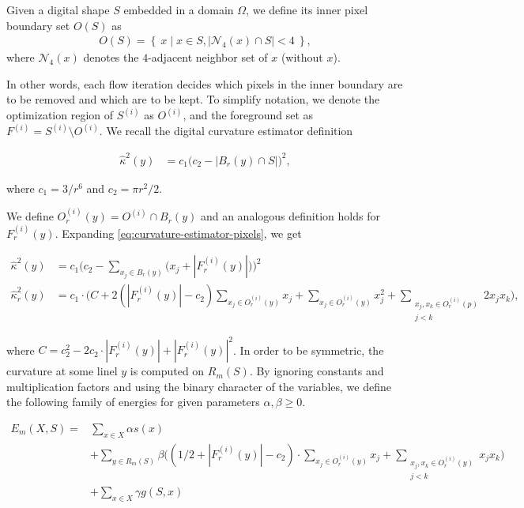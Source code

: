 \documentclass[runningheads]{llncs}
\begin{document}
\begin{definition}
{
Given a digital shape $S$ embedded in a domain $\Omega$, we define its inner pixel boundary set $O(S)$ as
\begin{align*}
	O(S) = \left\{ \: x \; | \; x \in S, |\mathcal{N}_4(x) \cap S|<4 \: \right\},
\end{align*}
where $\mathcal{N}_4(x)$ denotes the $4$-adjacent neighbor set of $x$ (without $x$).
}
\end{definition}

In other words, each flow iteration decides which pixels in the inner boundary are to be removed and which are to be kept. To simplify notation, we denote the optimization region of $S^{(i)}$ as $O^{(i)}$, and the foreground set as $F^{(i)} = S^{(i)} \setminus O^{(i)}$. We recall the digital curvature estimator definition
	
\begin{align}
	\hat{\kappa}^2(y) &= c_1\Big( c_2 - | B_r(y) \cap S | \Big)^2, 
	\label{eq:curvature-estimator-pixels}
\end{align}

where $c_1=3/r^6$ and $c_2=\pi r^2/2$. 

We define $O_{r}^{(i)}(y) = O^{(i)} \cap B_r(y)$ and an analogous definition holds for $F_{r}^{(i)}(y)$. Expanding \eqref{eq:curvature-estimator-pixels}, we get 

	\begin{align*}
		\hat{\kappa}^2(y) &= c_1\Big( c_2 - \sum_{x_j \in B_r(y)} \big( {x_j} + |F_{r}^{(i)}(y)| \big) \Big)^2 \\
		\hat{\kappa}_{r}^2(y) &= c_1 \cdot \Big( C + 2\left( |F_{r}^{(i)}(y)| - c_2 \right) \sum_{x_j \in O_{r}^{(i)}(y)}{x_j} + \sum_{x_j \in O_{r}^{(i)}(y)}{x_j^2} + \sum_{ \substack{x_j,x_k \in O_{r}^{(i)}(p) \\ j<k} }{2x_jx_k}  \Big),
	\end{align*}
	
	where $C=c_2^2 - 2c_2 \cdot |F_{r}^{(i)}(y)| + |F_{r}^{(i)}(y)|^2$. In order to be symmetric, the curvature at some linel $y$ is computed on $R_m(S)$. By ignoring constants and multiplication factors and using the binary character of the variables, we define the following family of energies for given parameters $\alpha,\beta \geq 0$.
	
	\begin{align}
		E_m(X,S) =& \sum_{x \in X}{\alpha s(x)} \nonumber \\ 
		& + \sum_{y \in R_m(S)}{ \beta \Big( { (1/2+ |F_{r}^{(i)}(y)|-c_2) \cdot \sum_{x_j \in O_{r}^{(i)}(y)}{x_j} } + \sum_{ \substack{x_j,x_k \in O_{r}^{(i)}(y) \\ j<k} }{x_jx_k} \Big) } \nonumber \\
		& + \sum_{x \in X}{\gamma g(S,x)}
		\label{eq:energy-family}
	\end{align}
	
\end{document}
